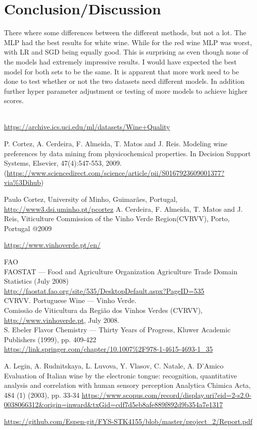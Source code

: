 \documentclass[12pt, letterpaper, twoside]{article}
\begin{document}
\section{Conclusion/Discussion}
There where some differences between the different methods, but not a lot. The MLP had the best results for white wine. While for the red wine MLP was worst, with LR and SGD being equally good. This is surprising as even though none of the models had extremely impressive results. I would have expected the best model for both sets to be the same. It is apparent that more work need to be done to test whether or not the two datasets need different models. In addition further hyper parameter adjustment or testing of more models to achieve higher scores.\\
\newpage
\ \\ 
\begin{thebibliography}{9}
\url{https://archive.ics.uci.edu/ml/datasets/Wine+Quality}

P. Cortez, A. Cerdeira, F. Almeida, T. Matos and J. Reis. Modeling wine preferences by data mining from physicochemical properties. In Decision Support Systems, Elsevier, 47(4):547-553, 2009. (\url{https://www.sciencedirect.com/science/article/pii/S0167923609001377?via%3Dihub})

Paulo Cortez, University of Minho, Guimarães, Portugal, \url{http://www3.dsi.uminho.pt/pcortez}
A. Cerdeira, F. Almeida, T. Matos and J. Reis, Viticulture Commission of the Vinho Verde Region(CVRVV), Porto, Portugal
@2009

\url{https://www.vinhoverde.pt/en/}

FAO\\
FAOSTAT — Food and Agriculture Organization Agriculture Trade Domain Statistics (July 2008)\\
\url{http://faostat.fao.org/site/535/DesktopDefault.aspx?PageID=535}\\

CVRVV. Portuguese Wine — Vinho Verde.\\
Comissão de Viticultura da Região dos Vinhos Verdes (CVRVV),\\ 
\url{http://www.vinhoverde.pt}, July 2008.\\

S. Ebeler
Flavor Chemistry — Thirty Years of Progress, Kluwer Academic Publishers (1999), pp. 409-422
\url{https://link.springer.com/chapter/10.1007%2F978-1-4615-4693-1_35}

A. Legin, A. Rudnitskaya, L. Luvova, Y. Vlasov, C. Natale, A. D'Amico
Evaluation of Italian wine by the electronic tongue: recognition, quantitative analysis and correlation with human sensory perception
Analytica Chimica Acta, 484 (1) (2003), pp. 33-34
\url{https://www.scopus.com/record/display.uri?eid=2-s2.0-0038066312&origin=inward&txGid=cdf7d5eb8afe889f892d9b354a7e1317}

\url{https://github.com/Espen-git/FYS-STK4155/blob/master/project_2/Report.pdf}
\end{thebibliography}
\end{document}
